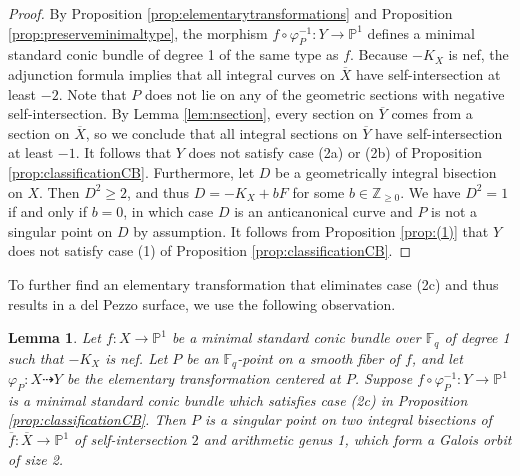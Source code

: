 \documentclass[a4paper, 11pt, reqno]{amsart}
\numberwithin{equation}{section} \numberwithin{figure}{section}
\def \F {{\mathbb F}}
\def \P {{\mathbb P}}
\def \Z {{\mathbb Z}}
\newcommand{\ra}{\rightarrow}
\newtheorem{lemma}{Lemma}
\theoremstyle{definition}
\numberwithin{lemma}{section}
\begin{document}
\begin{proof}
    By Proposition \ref{prop:elementarytransformations} and Proposition \ref{prop:preserveminimaltype}, the morphism $f \circ \varphi_{\scriptscriptstyle P}^{-1} \colon Y \ra \P^1$ defines a minimal standard conic bundle of degree 1 of the same type as $f$. Because $-K_X$ is nef, the adjunction formula implies that all integral curves on $\overline{X}$ have self-intersection at least $-2$. Note that $P$ does not lie on any of the geometric sections with negative self-intersection. By Lemma \ref{lem:nsection}, every section on $\overline{Y}$ comes from a section on $\overline{X}$, so we conclude that all integral sections on $\overline{Y}$ have self-intersection at least $-1$. It follows that $Y$ does not satisfy case (2a) or (2b) of Proposition \ref{prop:classificationCB}. Furthermore, let $D$ be a geometrically integral bisection on $X$. Then $D^2 \geq 2$, and thus $D = -K_X + b F$ for some $b \in \Z_{\geq 0}$. We have $D^2 = 1$ if and only if $b = 0$, in which case $D$ is an anticanonical curve and $P$ is not a singular point on $D$ by assumption. It follows from Proposition \ref{prop:(1)} that $Y$ does not satisfy case (1) of Proposition \ref{prop:classificationCB}.
\end{proof}

To further find an elementary transformation that eliminates case (2c) and thus results in a del Pezzo surface, we use the following observation.

\begin{lemma}\label{lem:(2c)to(2c)}
    Let $f \colon X \ra \P^1$ be a minimal standard conic bundle over $\F_q$ of degree 1 such that $-K_X$ is nef. Let $P$ be an $\F_q$-point on a smooth fiber of $f$, and let $\varphi_{\scriptscriptstyle P} \colon X \dashrightarrow Y$ be the elementary transformation centered at $P$. Suppose $f \circ \varphi_{\scriptscriptstyle P}^{-1} \colon Y \ra \P^1$ is a minimal standard conic bundle which satisfies case (2c) in Proposition \ref{prop:classificationCB}. 
    Then $P$ is a singular point on two integral bisections of $\overline{f} \colon \overline{X} \ra \P^1$ of self-intersection $2$ and arithmetic genus 1, which form a Galois orbit of size 2. 
\end{lemma}
\end{document}
